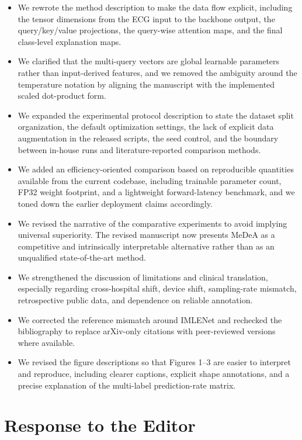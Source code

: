 \documentclass[11pt]{article}
\begin{document}
\begin{itemize}
    \item We rewrote the method description to make the data flow explicit, including the tensor dimensions from the ECG input to the backbone output, the query/key/value projections, the query-wise attention maps, and the final class-level explanation maps.
    \item We clarified that the multi-query vectors are global learnable parameters rather than input-derived features, and we removed the ambiguity around the temperature notation by aligning the manuscript with the implemented scaled dot-product form.
    \item We expanded the experimental protocol description to state the dataset split organization, the default optimization settings, the lack of explicit data augmentation in the released scripts, the seed control, and the boundary between in-house runs and literature-reported comparison methods.
    \item We added an efficiency-oriented comparison based on reproducible quantities available from the current codebase, including trainable parameter count, FP32 weight footprint, and a lightweight forward-latency benchmark, and we toned down the earlier deployment claims accordingly.
    \item We revised the narrative of the comparative experiments to avoid implying universal superiority. The revised manuscript now presents MeDeA as a competitive and intrinsically interpretable alternative rather than as an unqualified state-of-the-art method.
    \item We strengthened the discussion of limitations and clinical translation, especially regarding cross-hospital shift, device shift, sampling-rate mismatch, retrospective public data, and dependence on reliable annotation.
    \item We corrected the reference mismatch around IMLENet and rechecked the bibliography to replace arXiv-only citations with peer-reviewed versions where available.
    \item We revised the figure descriptions so that Figures 1--3 are easier to interpret and reproduce, including clearer captions, explicit shape annotations, and a precise explanation of the multi-label prediction-rate matrix.
\end{itemize}

\section*{Response to the Editor}
\end{document}
